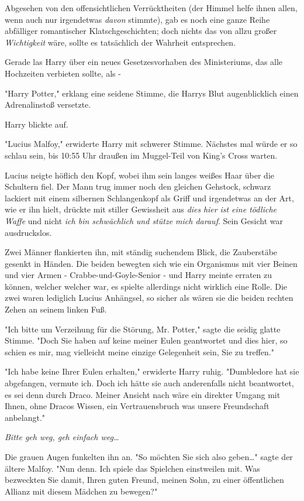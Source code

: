 {Abgesehen von den offensichtlichen Verrücktheiten (der Himmel helfe ihnen allen, wenn auch nur irgendetwas \emph{davon} stimmte), gab es noch eine ganze Reihe abfälliger romantischer Klatschgeschichten; doch nichts das von allzu großer \emph{Wichtigkeit} wäre, sollte es tatsächlich der Wahrheit entsprechen.

Gerade las Harry über ein neues Gesetzesvorhaben des Ministeriums, das alle Hochzeiten verbieten sollte, als -

"Harry Potter," erklang eine seidene Stimme, die Harrys Blut augenblicklich einen Adrenalinstoß versetzte.

Harry blickte auf.

"Lucius Malfoy," erwiderte Harry mit schwerer Stimme. Nächstes mal würde er so schlau sein, bis 10:55 Uhr draußen im Muggel-Teil von King's Cross warten.

Lucius neigte höflich den Kopf, wobei ihm sein langes weißes Haar über die Schultern fiel. Der Mann trug immer noch den gleichen Gehstock, schwarz lackiert mit einem silbernen Schlangenkopf als Griff und irgendetwas an der Art, wie er ihn hielt, drückte mit stiller Gewissheit aus \emph{dies} \emph{hier} \emph{ist eine tödliche Waffe} und nicht \emph{ich bin schwächlich} \emph{und stütze mich darauf}. Sein Gesicht war ausdruckslos.

Zwei Männer flankierten ihn, mit ständig suchendem Blick, die Zauberstäbe gesenkt in Händen. Die beiden bewegten sich wie ein Organismus mit vier Beinen und vier Armen - Crabbe-und-Goyle-Senior - und Harry meinte erraten zu können, welcher welcher war, es spielte allerdings nicht wirklich eine Rolle. Die zwei waren lediglich Lucius Anhängsel, so sicher als wären sie die beiden rechten Zehen an seinem linken Fuß.

"Ich bitte um Verzeihung für die Störung, Mr. Potter," sagte die seidig glatte Stimme. "Doch Sie haben auf keine meiner Eulen geantwortet und dies hier, so schien es mir, mag vielleicht meine einzige Gelegenheit sein, Sie zu treffen."

"Ich habe keine Ihrer Eulen erhalten," erwiderte Harry ruhig. "Dumbledore hat sie abgefangen, vermute ich. Doch ich hätte sie auch anderenfalls nicht beantwortet, es sei denn durch Draco. Meiner Ansicht nach wäre ein direkter Umgang mit Ihnen, ohne Dracos Wissen, ein Vertrauensbruch was unsere Freundschaft anbelangt."

\emph{Bitte geh weg, geh einfach weg…}

Die grauen Augen funkelten ihn an. "So möchten Sie sich also geben…" sagte der ältere Malfoy. "Nun denn. Ich spiele das Spielchen einstweilen mit. Was bezweckten Sie damit, Ihren guten Freund, meinen Sohn, zu einer öffentlichen Allianz mit diesem Mädchen zu bewegen?"

}
